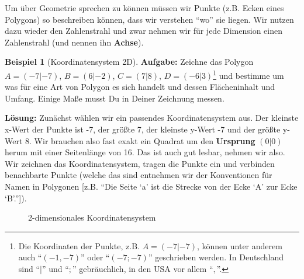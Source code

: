 \documentclass[a4paper]{book}%
\theoremstyle{definition}
\newtheorem{beispiel}{Beispiel}
\begin{document}
Um über Geometrie sprechen zu können müssen wir Punkte (z.B. Ecken eines Polygons) so beschreiben können, dass wir verstehen \enquote{wo} sie liegen. Wir nutzen dazu wieder den Zahlenstrahl und zwar nehmen wir für jede Dimension einen Zahlenstrahl (und nennen ihn \textbf{Achse}).

\begin{beispiel}[Koordinatensystem 2D]
\textbf{Aufgabe:} Zeichne das Polygon $A=(-7|-7)$, $B=(6|-2)$, $C=(7|8)$, $D=(-6|3)$\footnote{Die Koordinaten der Punkte, z.B. $A=(-7|-7)$, können unter anderem auch \enquote{$(-1,-7)$} oder \enquote{$(-7;-7)$} geschrieben werden. In Deutschland sind \enquote{$|$} und \enquote{$;$} gebräuchlich, in den USA vor allem \enquote{$,$}.} und bestimme um was für eine Art von Polygon es sich handelt und dessen Flächeninhalt und Umfang. Einige Maße musst Du in Deiner Zeichnung messen.

\textbf{Lösung:} Zunächst wählen wir ein passendes Koordinatensystem aus. Der kleinste x-Wert der Punkte ist -7, der größte 7, der kleinste y-Wert -7 und der größte y-Wert 8. Wir brauchen also fast exakt ein Quadrat um den \textbf{Ursprung} $(0|0)$ herum  mit einer Seitenlänge von 16. Das ist auch gut lesbar, nehmen wir also. Wir zeichnen das Koordinatensystem, tragen die Punkte ein und verbinden benachbarte Punkte (welche das sind entnehmen wir der Konventionen für Namen in Polygonen [z.B. \enquote{Die Seite \enquote{a} ist die Strecke von der Ecke \enquote{A} zur Ecke \enquote{B}.}]).

\begin{figure}[ht]
  \centering
  \caption{2-dimensionales Koordinatensystem}\label{fig:koordinatensystem2D}
\end{figure}


\end{beispiel}
\end{document}
